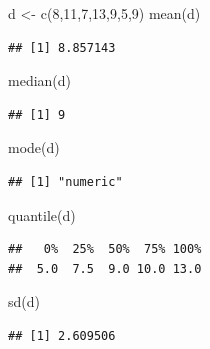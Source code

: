 \documentclass[
]{book}
\newenvironment{Shaded}{\begin{snugshade}}{\end{snugshade}}
\newcommand{\DecValTok}[1]{\textcolor[rgb]{0.00,0.00,0.81}{#1}}
\newcommand{\FunctionTok}[1]{\textcolor[rgb]{0.00,0.00,0.00}{#1}}
\newcommand{\NormalTok}[1]{#1}
\newcommand{\OtherTok}[1]{\textcolor[rgb]{0.56,0.35,0.01}{#1}}
\begin{document}
\begin{Shaded}
\begin{Highlighting}[]
\NormalTok{d }\OtherTok{\textless{}{-}} \FunctionTok{c}\NormalTok{(}\DecValTok{8}\NormalTok{,}\DecValTok{11}\NormalTok{,}\DecValTok{7}\NormalTok{,}\DecValTok{13}\NormalTok{,}\DecValTok{9}\NormalTok{,}\DecValTok{5}\NormalTok{,}\DecValTok{9}\NormalTok{)}
\FunctionTok{mean}\NormalTok{(d)}
\end{Highlighting}
\end{Shaded}

\begin{verbatim}
## [1] 8.857143
\end{verbatim}

\begin{Shaded}
\begin{Highlighting}[]
\FunctionTok{median}\NormalTok{(d)}
\end{Highlighting}
\end{Shaded}

\begin{verbatim}
## [1] 9
\end{verbatim}

\begin{Shaded}
\begin{Highlighting}[]
\FunctionTok{mode}\NormalTok{(d)}
\end{Highlighting}
\end{Shaded}

\begin{verbatim}
## [1] "numeric"
\end{verbatim}

\begin{Shaded}
\begin{Highlighting}[]
\FunctionTok{quantile}\NormalTok{(d)}
\end{Highlighting}
\end{Shaded}

\begin{verbatim}
##   0%  25%  50%  75% 100% 
##  5.0  7.5  9.0 10.0 13.0
\end{verbatim}

\begin{Shaded}
\begin{Highlighting}[]
\FunctionTok{sd}\NormalTok{(d)}
\end{Highlighting}
\end{Shaded}

\begin{verbatim}
## [1] 2.609506
\end{verbatim}
\end{document}
